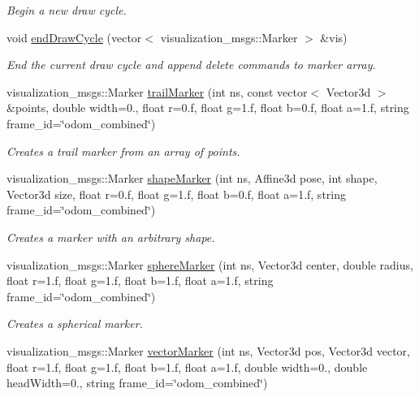 \begin{DoxyCompactItemize}
\begin{DoxyCompactList}\small\item\em Begin a new draw cycle. \end{DoxyCompactList}\item 
void \hyperlink{classVisualizationManager_adeeb76e606e872e17984fb372ee295ad}{end\-Draw\-Cycle} (vector$<$ visualization\-\_\-msgs\-::\-Marker $>$ \&vis)
\begin{DoxyCompactList}\small\item\em End the current draw cycle and append delete commands to marker array. \end{DoxyCompactList}\item 
visualization\-\_\-msgs\-::\-Marker \hyperlink{classVisualizationManager_aebf5df7c638e1ecf0cc3bacde43c615e}{trail\-Marker} (int ns, const vector$<$ Vector3d $>$ \&points, double width=0., float r=0.f, float g=1.f, float b=0.f, float a=1.f, string frame\-\_\-id=\char`\"{}odom\-\_\-combined\char`\"{})
\begin{DoxyCompactList}\small\item\em Creates a trail marker from an array of points. \end{DoxyCompactList}\item 
visualization\-\_\-msgs\-::\-Marker \hyperlink{classVisualizationManager_a9c99686f3418df6a11e10e8f59ba7c4d}{shape\-Marker} (int ns, Affine3d pose, int shape, Vector3d size, float r=0.f, float g=1.f, float b=0.f, float a=1.f, string frame\-\_\-id=\char`\"{}odom\-\_\-combined\char`\"{})
\begin{DoxyCompactList}\small\item\em Creates a marker with an arbitrary shape. \end{DoxyCompactList}\item 
visualization\-\_\-msgs\-::\-Marker \hyperlink{classVisualizationManager_a1b5d2724fb4d8520936b9be6e8b58e55}{sphere\-Marker} (int ns, Vector3d center, double radius, float r=1.f, float g=1.f, float b=1.f, float a=1.f, string frame\-\_\-id=\char`\"{}odom\-\_\-combined\char`\"{})
\begin{DoxyCompactList}\small\item\em Creates a spherical marker. \end{DoxyCompactList}\item 
visualization\-\_\-msgs\-::\-Marker \hyperlink{classVisualizationManager_a470dca284f28b0884053b7e02550ff3a}{vector\-Marker} (int ns, Vector3d pos, Vector3d vector, float r=1.f, float g=1.f, float b=1.f, float a=1.f, double width=0., double head\-Width=0., string frame\-\_\-id=\char`\"{}odom\-\_\-combined\char`\"{})

\end{DoxyCompactItemize}
